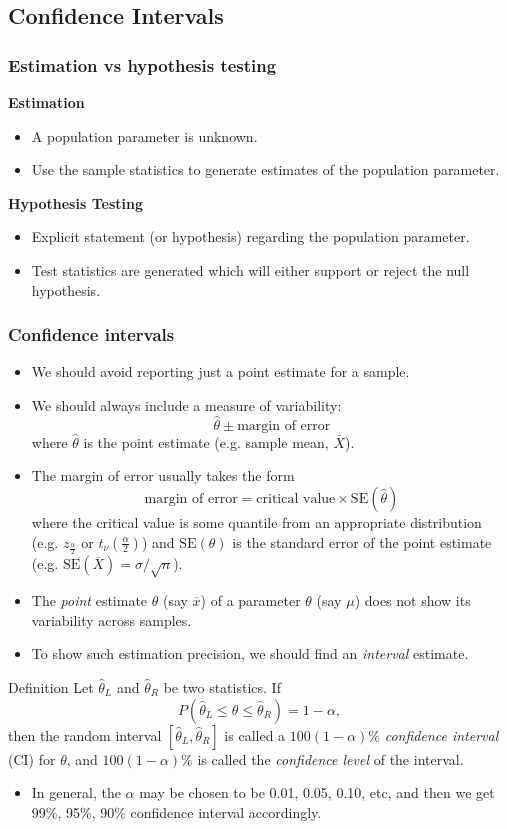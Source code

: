 \documentclass[a4paper]{article}
\begin{document}
\subsection{Confidence Intervals}
\subsubsection{Estimation vs hypothesis testing}
\textbf{Estimation}
\begin{itemize}
	\item A population parameter is unknown.
	\item Use the sample statistics to generate estimates of the population parameter.
\end{itemize}
\textbf{Hypothesis Testing}
\begin{itemize}
	\item Explicit statement (or hypothesis) regarding the population parameter.
	\item Test statistics are generated which will either support or reject the null hypothesis.
\end{itemize}
\subsubsection{Confidence intervals}
\begin{itemize}
	\item We should avoid reporting just a point estimate for a sample.
	\item We should always include a measure of variability:
	\[
		\hat{\theta} \pm \text{margin of error}
	\]
	where \( \hat{\theta} \) is the point estimate (e.g. sample mean, \( \overline{X} \)).
	\item The margin of error usually takes the form
	\[
		\text{margin of error} = \text{critical value} \times \mathrm{SE}(\hat{\theta})
	\]
	where the critical value is some quantile from an appropriate distribution (e.g. \( z_{\frac{\alpha}{2}} \) or \( t_\nu(\frac{\alpha}{2}) \))  and \( \mathrm{SE}(\theta) \) is the standard error of the point estimate (e.g. \( \mathrm{SE}(\overline{X}) = \sigma / \sqrt{n} \)).
	\item The \textit{point} estimate \( \hat{\theta} \) (say \( \overline{x} \)) of a parameter \( \theta \) (say \( \mu \)) does not show its variability across samples.
	\item To show such estimation precision, we should find an \textit{interval} estimate.
\end{itemize}
\begin{bluebox}{Definition}
	Let \( \hat{\theta}_L \) and \( \hat{\theta}_R \) be two statistics. If
	\[
		P(\hat{\theta}_L \leq \theta \leq \hat{\theta}_R) = 1 - \alpha,
	\]
	then the random interval \( [\hat{\theta}_L,\hat{\theta}_R] \) is called a \( 100(1-\alpha)\% \) \textit{confidence interval} (CI) for \( \theta \), and \( 100(1-\alpha)\% \) is called the \textit{confidence level} of the interval.
\end{bluebox}
\begin{itemize}
	\item In general, the \( \alpha \) may be chosen to be 0.01, 0.05, 0.10, etc, and then we get 99\%, 95\%, 90\% confidence interval accordingly.
\end{itemize}
\end{document}

